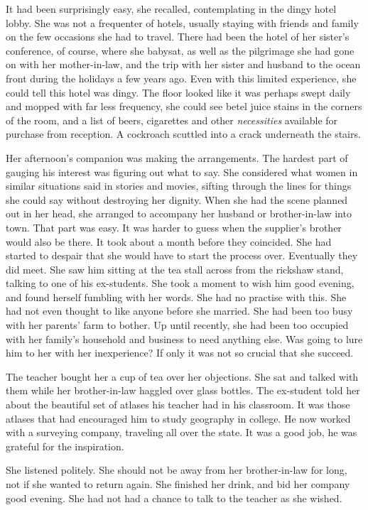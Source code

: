 \documentclass{article}
\begin{document}
It had been surprisingly easy, she recalled, contemplating in the dingy hotel lobby. She was not a frequenter of hotels, usually staying with friends and family on the few occasions she had to travel. There had been the hotel of her sister's conference, of course, where she babysat, as well as the pilgrimage she had gone on with her mother-in-law, and the trip with her sister and husband to the ocean front during the holidays a few years ago. Even with this limited experience, she could tell this hotel was dingy. The floor looked like it was perhaps swept daily and mopped with far less frequency, she could see betel juice stains in the corners of the room, and a list of beers, cigarettes and other \emph{necessities} available for purchase from reception. A cockroach scuttled into a crack underneath the stairs. 

Her afternoon's companion was making the arrangements. The hardest part of gauging his interest was figuring out what to say. She considered what women in similar situations said in stories and movies, sifting through the lines for things she could say without destroying her dignity. When she had the scene planned out in her head, she arranged to accompany her husband or brother-in-law into town. That part was easy. It was harder to guess when the supplier's brother would also be there. It took about a month before they coincided. She had started to despair that she would have to start the process over. Eventually they did meet. She saw him sitting at the tea stall across from the rickshaw stand, talking to one of his ex-students. She took a moment to wish him good evening, and found herself fumbling with her words. She had no practise with this. She had not even thought to like anyone before she married. She had been too busy with her parents' farm to bother. Up until recently, she had been too occupied with her family's household and business to need anything else. Was going to lure him to her with her inexperience? If only it was not so crucial that she succeed. 

The teacher bought her a cup of tea over her objections. She sat and talked with them while her brother-in-law haggled over glass bottles. The ex-student told her about the beautiful set of atlases his teacher had in his classroom. It was those atlases that had encouraged him to study geography in college. He now worked with a surveying company, traveling all over the state. It was a good job, he was grateful for the inspiration. 

She listened politely. She should not be away from her brother-in-law for long, not if she wanted to return again. She finished her drink, and bid her company good evening. She had not had a chance to talk to the teacher as she wished.
\end{document}
